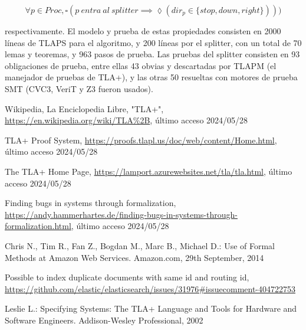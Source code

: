 \documentclass[runningheads]{llncs}
\begin{document}
\[
    \forall p \in Proc, \square(p\ entra\ al\ splitter \implies \lozenge(dir_p \in \{stop, down, right\})))    
\]

respectivamente.
El modelo y prueba de estas propiedades consisten en 2000 líneas de TLAPS para el algoritmo, y 200 líneas por el splitter, con un total de 70 lemas y teoremas, y 963 pasos de prueba. Las pruebas del splitter consisten en 93 obligaciones de prueba, entre ellas 43 obvias y descartadas por TLAPM (el manejador de pruebas de TLA+), y las otras 50 resueltas con motores de prueba SMT (CVC3, VeriT y Z3 fueron usados).


\begin{thebibliography}{8}
Wikipedia, La Enciclopedia Libre, "TLA+", \url{https://en.wikipedia.org/wiki/TLA%2B}, último acceso 2024/05/28

TLA+ Proof System, \url{https://proofs.tlapl.us/doc/web/content/Home.html}, último acceso 2024/05/28

The TLA+ Home Page, \url{https://lamport.azurewebsites.net/tla/tla.html}, último acceso 2024/05/28

Finding bugs in systems through formalization, \url{https://andy.hammerhartes.de/finding-bugs-in-systems-through-formalization.html}, último acceso 2024/05/28

Chris N., Tim R., Fan Z., Bogdan M., Marc B., Michael D.: Use of Formal Methods at Amazon Web Services. Amazon.com, 29th September, 2014

Possible to index duplicate documents with same id and routing id, \url{https://github.com/elastic/elasticsearch/issues/31976#issuecomment-404722753}

Leslie L.: Specifying Systems: The TLA+ Language and Tools for Hardware and Software Engineers. Addison-Wesley Professional, 2002

\end{thebibliography}
\end{document}

